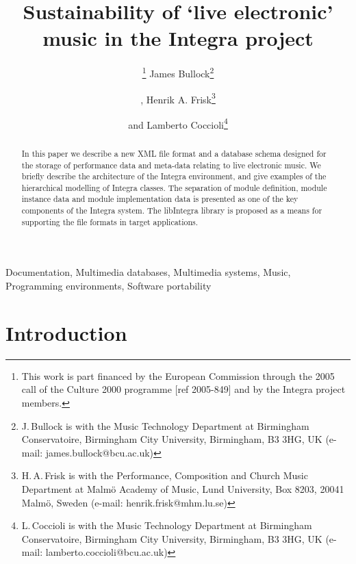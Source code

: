 \documentclass[10pt,journal,final]{IEEEtran}
\begin{document}
\pagestyle{empty} 

\title{Sustainability of `live electronic' music in the Integra project}


\author{\thanks{This work is part financed by the European Commission through the 2005 call of the Culture 2000 programme [ref 2005-849] and by the Integra project members.}
  James Bullock\thanks{J.\,Bullock is with the Music Technology Department at Birmingham Conservatoire, Birmingham City University, Birmingham, B3 3HG, UK (e-mail: james.bullock@bcu.ac.uk)}%
  \and, Henrik A. Frisk\thanks{H.\,A.\,Frisk is with the Performance, Composition and Church Music Department at Malm\"{o} Academy of Music, Lund University, Box 8203, 20041 Malm\"{o}, Sweden (e-mail: henrik.frisk@mhm.lu.se)}
  \and and Lamberto Coccioli\thanks{L.\,Coccioli is  with the Music Technology Department at Birmingham Conservatoire, Birmingham City University, Birmingham, B3 3HG, UK (e-mail: lamberto.coccioli@bcu.ac.uk)}}


\maketitle

\thispagestyle{empty}

\begin{abstract}
In this paper we describe a new XML file format and a database schema designed for the storage of performance data and meta-data relating to live electronic music. We briefly describe the architecture of the Integra environment, and give examples of the hierarchical modelling of Integra classes. The separation of module definition, module instance data and module implementation data is presented as one of the key components of the Integra system. The libIntegra library is proposed as a means for supporting the file formats in target applications.
\end{abstract}

\begin{keywords}
Documentation, Multimedia databases, Multimedia systems, Music, Programming environments, Software portability
\end{keywords}

\section{Introduction}\label{sec:introduction}
\end{document}
